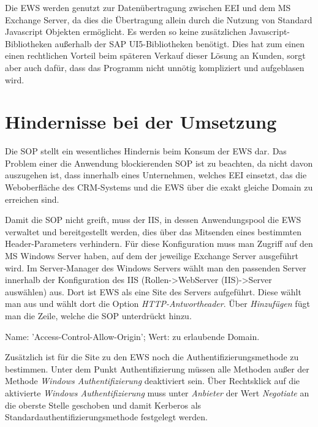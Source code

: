 Die \ac{EWS} werden genutzt zur Datenübertragung zwischen \ac{EEI} und dem \ac{MS} Exchange Server, da dies die Übertragung allein durch die Nutzung von Standard Javascript Objekten ermöglicht. Es werden so keine zusätzlichen Javascript-Bibliotheken außerhalb der SAP UI5-Bibliotheken benötigt. Dies hat zum einen einen rechtlichen Vorteil beim späteren Verkauf dieser Lösung an Kunden, sorgt aber auch dafür, dass das Programm nicht unnötig kompliziert und aufgeblasen wird.

\section{Hindernisse bei der Umsetzung}
Die \ac{SOP} stellt ein wesentliches Hindernis beim Konsum der \ac{EWS} dar. Das Problem einer die Anwendung blockierenden \ac{SOP} ist zu beachten, da nicht davon auszugehen ist, dass innerhalb eines Unternehmen, welches \ac{EEI} einsetzt, das die Weboberfläche des \ac{CRM}-Systems und die \ac{EWS} über die exakt gleiche Domain zu erreichen sind.

Damit die \ac{SOP} nicht greift, muss der \ac{IIS}, in dessen Anwendungspool die \ac{EWS} verwaltet und bereitgestellt werden, dies über das Mitsenden eines bestimmten Header-Parameters verhindern. Für diese Konfiguration muss man Zugriff auf den \ac{MS} Windows Server haben, auf dem der jeweilige Exchange Server ausgeführt wird. Im Server-Manager des Windows Servers wählt man den passenden Server innerhalb der Konfiguration des \ac{IIS} (Rollen->WebServer (IIS)->Server auswählen) aus. Dort ist \ac{EWS} als eine Site des Servers aufgeführt. Diese wählt man aus und wählt dort die Option \emph{HTTP-Antwortheader}. Über \emph{Hinzufügen} fügt man die Zeile, welche die SOP unterdrückt hinzu. 

Name: 'Access-Control-Allow-Origin'; Wert: zu erlaubende Domain.

Zusätzlich ist für die Site zu den \ac{EWS} noch die Authentifizierungsmethode zu bestimmen. Unter dem Punkt Authentifizierung müssen alle Methoden außer der Methode \emph{Windows Authentifizierung} deaktiviert sein. Über Rechtsklick auf die aktivierte \emph{Windows Authentifizierung} muss unter \emph{Anbieter} der Wert \emph{Negotiate} an die oberste Stelle geschoben und damit Kerberos als Standardauthentifizierungsmethode festgelegt werden. \cite{Jaganathan.2006}

\pagebreak

